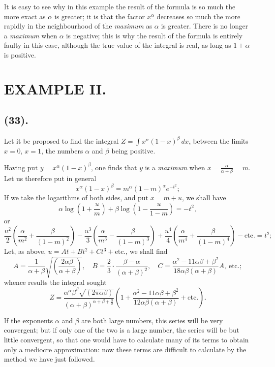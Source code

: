 \documentclass{article}
\begin{document}
It is easy to see why in this example the result of the formula is so much the more exact as $\alpha$ is greater; it is that the factor $x^{\alpha}$ decreases so much the more rapidly in the neighbourhood of the \emph{maximum} as $\alpha$ is greater. There is no longer a \emph{maximum} when $\alpha$ is negative; this is why the result of the formula is entirely faulty in this case, although the true value of the integral is real, as long as $1+\alpha$ is positive.


\section*{EXAMPLE II.}

\subsection*{(33).}

Let it be proposed to find the integral $Z=\displaystyle\int x^{\alpha}(1-x)^{\beta}\,dx$, between the limits $x=0$, $x=1$, the numbers $\alpha$ and $\beta$ being positive.

Having put $y=x^{\alpha}(1-x)^{\beta}$, one finds that $y$ is a \emph{maximum} when $x=\frac{\alpha}{\alpha+\beta}=m$. Let us therefore put in general
\[ x^{\alpha}(1-x)^{\beta}=m^{\alpha}(1-m)^{\alpha}e^{-t^{2}}; \]
If we take the logarithms of both sides, and put $x=m+u$, we shall have
\[ \alpha\log\left(1+\frac{u}{m}\right)+\beta\log\left(1-\frac{u}{1-m}\right)=-t^{2}, \]
or
\[ \frac{u^{2}}{2}\left(\frac{\alpha}{m^{2}}+\frac{\beta}{(1-m)^{2}}\right)-\frac{u^{3}}{3}\left(\frac{\alpha}{m^{3}}-\frac{\beta}{(1-m)^{3}}\right)+\frac{u^{4}}{4}\left(\frac{\alpha}{m^{4}}+\frac{\beta}{(1-m)^{4}}\right)-\text{etc.}=t^{2}; \]
Let, as above, $u=At+Bt^{2}+Ct^{3}+\text{etc.}$, we shall find
\[ A=\frac{1}{\alpha+\beta}\sqrt{\left(\frac{2\alpha\beta}{\alpha+\beta}\right)},\quad B=\frac{2}{3}\cdot\frac{\beta-\alpha}{(\alpha+\beta)^{2}},\quad C=\frac{\alpha^{2}-11\alpha\beta+\beta^{2}}{18\alpha\beta(\alpha+\beta)}A,\ \text{etc.}; \]
whence results the integral sought
\[ Z=\frac{\alpha^{\alpha}\beta^{\beta}\sqrt{(2\pi\alpha\beta)}}{(\alpha+\beta)^{\alpha+\beta+\frac{3}{2}}}\left(1+\frac{\alpha^{2}-11\alpha\beta+\beta^{2}}{12\alpha\beta(\alpha+\beta)}+\text{etc.}\right). \]

If the exponents $\alpha$ and $\beta$ are both large numbers, this series will be very convergent; but if only one of the two is a large number, the series will be but little convergent, so that one would have to calculate many of its terms to obtain only a mediocre approximation: now these terms are difficult to calculate by the method we have just followed.
\end{document}
